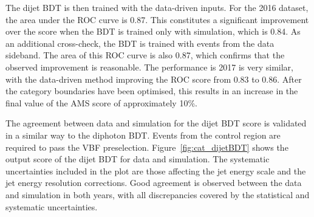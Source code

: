 The dijet BDT is then trained with the data-driven inputs.
For the 2016 dataset, the area under the ROC curve is 0.87.
This constitutes a significant improvement over the score when the BDT is trained only with simulation, 
which is 0.84.
As an additional cross-check, the BDT is trained with events from the data sideband. 
The area of this ROC curve is also 0.87, 
which confirms that the observed improvement is reasonable.
The performance is 2017 is very similar, 
with the data-driven method improving the ROC score from 0.83 to 0.86.
After the category boundaries have been optimised, 
this results in an increase in the final value of the AMS score of approximately 10\%.

The agreement between data and simulation for the dijet BDT score is validated 
in a similar way to the diphoton BDT.
Events from the \Zee control region are required to pass the VBF preselection.
Figure~\ref{fig:cat_dijetBDT} shows the output score of the dijet BDT for data and simulation.
The systematic uncertainties included in the plot are those affecting the 
jet energy scale and the jet energy resolution corrections.
Good agreement is observed between the data and simulation in both years, 
with all discrepancies covered by the statistical and systematic uncertainties.

